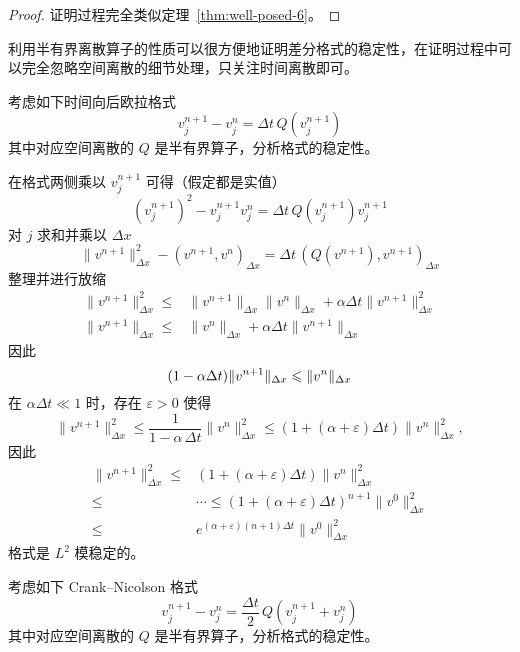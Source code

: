 \begin{proof}
    证明过程完全类似定理~\ref{thm:well-posed-6}。
\end{proof}

利用半有界离散算子的性质可以很方便地证明差分格式的稳定性，在证明过程中可以完全忽略空间离散的细节处理，只关注时间离散即可。

\begin{example}
    考虑如下时间向后欧拉格式
    \[
        v_j^{n+1} - v_j^n = \Delta t \,Q(v_j^{n+1})
    \]
    其中对应空间离散的 $Q$ 是半有界算子，分析格式的稳定性。
\end{example}

\begin{solution*}
    在格式两侧乘以 $v_j^{n+1}$ 可得（假定都是实值）
    \[
        (v_j^{n+1})^2 - v_j^{n+1} v_j^n = \Delta t \,Q(v_j^{n+1}) v_j^{n+1}
    \]
    对 $j$ 求和并乘以 $\Delta x$
    \[
        \|v^{n+1}\|_{\Delta x}^2 - (v^{n+1},v^{n})_{\Delta x} = \Delta t\, (Q(v^{n+1}),v^{n+1})_{\Delta x}
    \]
    整理并进行放缩
    \begin{align*}
        \|v^{n+1}\|_{\Delta x}^2 \le{} & \|v^{n+1}\|_{\Delta x} \|v^{n}\|_{\Delta x} + \alpha \Delta t \|v^{n+1}\|_{\Delta x}^2 \\
        \|v^{n+1}\|_{\Delta x} \le{}   & \|v^{n}\|_{\Delta x} + \alpha \Delta t \|v^{n+1}\|_{\Delta x}
    \end{align*}
    因此
    \[
        (1-\alpha \Delta t) \|v^{n+1}\|_{\Delta x} \le  \|v^{n}\|_{\Delta x}  \qedhere
    \]
    在 $\alpha \Delta t \ll 1$ 时，存在 $\varepsilon > 0$ 使得
    \[
        \|v^{n+1}\|_{\Delta x}^2 \le
        \frac{1}{1-\alpha \, \Delta t} \|v^{n}\|_{\Delta x}^2
        \le (1 + (\alpha +\varepsilon) \Delta t) \|v^{n}\|_{\Delta x}^2,
    \]
    因此
    \begin{align*}
        \|v^{n+1}\|_{\Delta x}^2 \le{} & (1 + (\alpha+\varepsilon) \Delta t) \|v^{n}\|_{\Delta x}^2                  \\
        \le{}                          & \cdots \le (1 + (\alpha+\varepsilon) \Delta t)^{n+1} \|v^{0}\|_{\Delta x}^2 \\
        \le{}                          & e^{(\alpha+\varepsilon) (n+1)\Delta t} \|v^{0}\|_{\Delta x}^2
    \end{align*}
    格式是 $L^2$ 模稳定的。
\end{solution*}

\begin{example}
    考虑如下 Crank–Nicolson 格式
    \[
        v_j^{n+1} - v_j^n = \frac{\Delta t}2 \,Q(v_j^{n+1} + v_j^n)
    \]
    其中对应空间离散的 $Q$ 是半有界算子，分析格式的稳定性。
\end{example}


